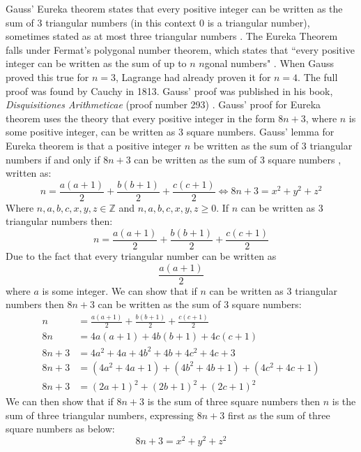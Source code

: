 \documentclass{article}
\begin{document}
Gauss' Eureka theorem states that every positive integer can be written as the sum of 3 triangular numbers (in this context 0 is a triangular number), sometimes stated as at most three triangular numbers \cite{polygonalnumbers}. The Eureka Theorem falls under Fermat's polygonal number theorem, which states that “every positive integer can be written as the sum of up to $n$ $n$gonal numbers" \cite{DisAr}. When Gauss proved this true for $n=3$, Lagrange had already proven it for $n=4$. The full proof was found by Cauchy in 1813. Gauss' proof was published in his book, \textit{Disquisitiones Arithmeticae} (proof number 293) \cite{DisAr}. Gauss' proof for Eureka theorem uses the theory that every positive integer in the form $8n+3$, where $n$ is some positive integer, can be written as 3 square numbers. Gauss' lemma for Eureka theorem is that a positive integer $n$ be written as the sum of 3 triangular numbers if and only if $8n+3$ can be written as the sum of 3 square numbers \cite{DisAr}, written as:
\begin{equation}
    n = \frac{a(a+1)}{2} + \frac{b(b+1)}{2} + \frac{c(c+1)}{2} \Leftrightarrow 8n+3 = x^2 + y^2 + z^2
\end{equation}
Where $n, a, b, c, x, y, z \in \mathbb{Z}$ and $ n,a,b,c,x,y,z \ge 0$. \newline
If $n$ can be written as 3 triangular numbers then:
\begin{equation}
    n = \frac{a(a+1)}{2} + \frac{b(b+1)}{2} + \frac{c(c+1)}{2}
\end{equation}
Due to the fact that every triangular number can be written as \[\frac{a(a+1)}{2}\] where $a$ is some integer. We can show that if $n$ can be written as 3 triangular numbers then $8n+3$ can be written as the sum of 3 square numbers:
\begin{align*}
    n &=  \frac{a(a+1)}{2} + \frac{b(b+1)}{2} + \frac{c(c+1)}{2} \\
    8n &= 4a(a+1) + 4b(b+1) + 4c(c+1)
    \\
    8n+3 &= 4a^2 + 4a + 4b^2 + 4b + 4c^2 + 4c + 3
    \\
    8n+3 &= (4a^2 + 4a + 1) + (4b^2 + 4b + 1) + (4c^2 + 4c + 1)
    \\
    8n+3 &= (2a+1)^2 + (2b+1)^2 + (2c+1)^2
\end{align*}
We can then show that if $8n+3$ is the sum of three square numbers then $n$ is the sum of three triangular numbers, expressing $8n+3$ first as the sum of three square numbers as below:
\begin{equation}
    8n+3 = x^2 + y^2 + z^2
\end{equation}
\end{document}
